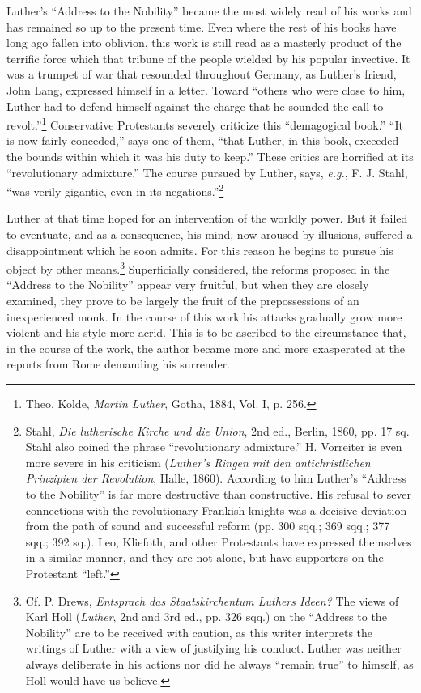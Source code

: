 Luther’s “Address to the Nobility” became the most widely read
of his works and has remained so up to the present time. Even where
the rest of his books have long ago fallen into oblivion, this work is
still read as a masterly product of the terrific force which that tribune
of the people wielded by his popular invective. It was a trumpet of
war that resounded throughout Germany, as Luther’s friend, John
Lang, expressed himself in a letter. Toward “others who were close
to him, Luther had to defend himself against the charge that he
sounded the call to revolt.”\footnote{Theo. Kolde, \textit{Martin Luther}, Gotha, 1884, Vol. I, p. 256.}
Conservative Protestants severely criticize this “demagogical book.” “It
is now fairly conceded,” says one
of them, “that Luther, in this book, exceeded the bounds within
which it was his duty to keep.” These critics are horrified at its “revolutionary
admixture.” The course pursued by Luther, says, \textit{e.g.},
F. J. Stahl, “was verily gigantic, even in its negations.”\footnote
{Stahl, \textit{Die lutherische Kirche und die Union}, 2nd ed., Berlin, 1860, pp. 17 sq. Stahl
also coined the phrase “revolutionary admixture.” H. Vorreiter is even more severe in his
criticism (\textit{Luther’s Ringen mit den antichristlichen Prinzipien der Revolution}, Halle,
1860). According to him Luther’s “Address to the Nobility” is far more destructive than
constructive. His refusal to sever connections with the revolutionary Frankish knights
was a decisive deviation from the path of sound and successful reform (pp. 300 sqq.; 369
sqq.; 377 sqq.; 392 sq.). Leo, Kliefoth, and other Protestants have expressed themselves in a
similar manner, and they are not alone, but have supporters on the Protestant “left.”}

Luther at that time hoped for an intervention of the worldly
power. But it failed to eventuate, and as a consequence, his mind,
now aroused by illusions, suffered a disappointment which he soon
admits. For this reason he begins to pursue his object by other means.\footnote
{Cf. P. Drews, \textit{Entsprach das Staatskirchentum Luthers Ideen?} The views of Karl Holl
(\textit{Luther}, 2nd and 3rd ed., pp. 326 sqq.) on the “Address to the Nobility” are to be
received with caution, as this writer interprets the writings of Luther with a view of
justifying his conduct. Luther was neither always deliberate in his actions nor did he
always “remain true” to himself, as Holl would have us believe.}
Superficially considered, the reforms proposed in the “Address to the
Nobility” appear very fruitful, but when they are closely examined,
they prove to be largely the fruit of the prepossessions of an inexperienced
monk. In the course of this work his attacks gradually
grow more violent and his style more acrid. This is to be ascribed
to the circumstance that, in the course of the work, the author became
more and more exasperated at the reports from Rome demanding
his surrender.

